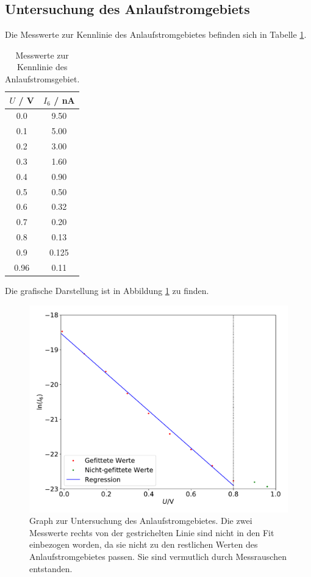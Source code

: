 \subsection{Untersuchung des Anlaufstromgebiets}
Die Messwerte zur Kennlinie des Anlaufstromgebietes befinden sich in Tabelle
\ref{tab:2}.
\begin{table}[h]
  \centering
  \caption{Messwerte zur Kennlinie des Anlaufstromsgebiet.}
  \label{tab:2}
  \begin{tabular}{c c}
    \toprule
    $U$ / \si{\volt} & $I_6$ / \si{\nano\ampere} \\
    \midrule
    0.0 & 9.50 \\
    0.1 & 5.00 \\
    0.2 & 3.00 \\
    0.3 & 1.60 \\
    0.4 & 0.90 \\
    0.5 & 0.50 \\
    0.6 & 0.32 \\
    0.7 & 0.20 \\
    0.8 & 0.13 \\
    0.9 & 0.125 \\
    0.96 & 0.11 \\
    \bottomrule
  \end{tabular}
\end{table}
Die grafische Darstellung ist in Abbildung \ref{fig:3} zu finden.
\begin{figure}[h]
  \centering
  \includegraphics[scale=0.3]{anlauf.pdf}
  \caption{Graph zur Untersuchung des Anlaufstromgebietes. Die zwei Messwerte rechts von der
  gestrichelten Linie sind nicht in den Fit einbezogen worden, da sie nicht zu den restlichen Werten
  des Anlaufstromgebietes passen. Sie sind vermutlich durch Messrauschen entstanden.}
  \label{fig:3}
\end{figure}
